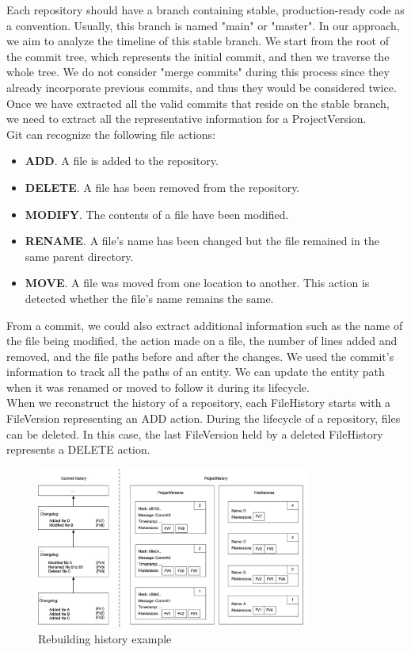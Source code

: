Each repository should have a branch containing stable, production-ready code as a convention. Usually, this branch is named "main" or "master". 
In our approach, we aim to analyze the timeline of this stable branch. We start from the root of the commit tree, which represents the initial commit, and then we traverse the whole tree. 
We do not consider "merge commits" during this process since they already incorporate previous commits, and thus they would be considered twice. 
Once we have extracted all the valid commits that reside on the stable branch, we need to extract all the representative information for a ProjectVersion. \\

Git can recognize the following file actions:
\begin{itemize}
    \item \textbf{ADD}. A file is added to the repository.
    \item \textbf{DELETE}. A file has been removed from the repository.
    \item \textbf{MODIFY}. The contents of a file have been modified.
    \item \textbf{RENAME}. A file's name has been changed but the file remained in the same parent directory.
    \item \textbf{MOVE}. A file was moved from one location to another. This action is detected whether the file's name remains the same. 
\end{itemize}

From a commit, we could also extract additional information such as the name of the file being modified, the action made on a file, the number of lines added and removed, and the file paths before and after the changes.
We used the commit's information to track all the paths of an entity. We can update the entity path when it was renamed or moved to follow it during its lifecycle. \\
When we reconstruct the history of a repository, each FileHistory starts with a FileVersion representing an ADD action.
During the lifecycle of a repository, files can be deleted. In this case, the last FileVersion held by a deleted FileHistory represents a DELETE action.

\begin{figure}
    \begin{center}
        \includegraphics[width=0.8\textwidth]{RebuildingHistory.jpg}
    \end{center}
    \caption{Rebuilding history example}
    \label{fig:RebuildingHistory}
\end{figure}

